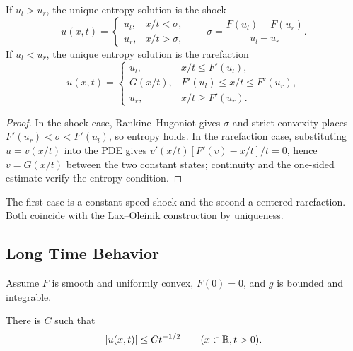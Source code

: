 \begin{theorem}
\label{thm:riemann-problem-solution}

If $u_l>u_r$, the unique entropy solution is the shock
\[
u(x,t)=\begin{cases}u_l,&x/t<\sigma,\\u_r,&x/t>\sigma,\end{cases}
\qquad \sigma=\frac{F(u_l)-F(u_r)}{u_l-u_r}.
\]
If $u_l<u_r$, the unique entropy solution is the rarefaction
\[
u(x,t)=\begin{cases}
u_l,&x/t\le F'(u_l),\\
G(x/t),&F'(u_l)\le x/t\le F'(u_r),\\
u_r,&x/t\ge F'(u_r).
\end{cases}
\]
\end{theorem}

\begin{proof}
\sketch In the shock case, Rankine--Hugoniot gives $\sigma$ and strict
convexity places $F'(u_r)<\sigma<F'(u_l)$, so entropy holds. In the rarefaction
case, substituting $u=v(x/t)$ into the PDE gives
$v'(x/t)[F'(v)-x/t]/t=0$, hence $v=G(x/t)$ between the two constant states;
continuity and the one-sided estimate verify the entropy condition.
\end{proof}

\begin{remark}
\label{rem:riemann-problem-shock-vs-rarefaction}

The first case is a constant-speed shock and the second a centered
rarefaction. Both coincide with the Lax--Oleinik construction by uniqueness.
\end{remark}

\subsection{Long Time Behavior}
\label{sec:conservation-laws-long-time-behavior}

Assume $F$ is smooth and uniformly convex, $F(0)=0$, and $g$ is bounded and
integrable.

\begin{theorem}
\label{thm:asymptotics-sup-norm}

There is $C$ such that
\[
|u(x,t)|\le Ct^{-1/2}\qquad(x\in\mathbb{R},t>0).
\]
\end{theorem}

